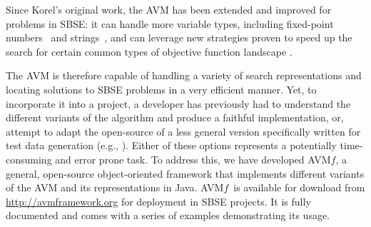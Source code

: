 \documentclass{llncs}
\newcommand{\name}{\mbox{AVM\hspace{-1pt}$f$}\xspace}
\newcommand{\repourl}{\url{http://avmframework.org}\xspace}
\begin{document}

Since Korel's original work, the AVM has been extended and improved for problems in SBSE: it can handle more variable types, including fixed-point numbers~\cite{Harman2007} and strings~\cite{Kapfhammer2013,McMinn2015}, and can leverage new strategies proven to speed up the search for certain common types of objective function landscape \cite{Kempka2013,Kempka2015}.

The AVM is therefore capable of handling a variety of search representations and locating solutions to SBSE problems in a very efficient manner. Yet, to incorporate it into a project, a developer has previously had to understand the different variants of the algorithm and produce a faithful implementation, or, attempt to adapt the open-source of a less general version specifically written for test data generation (e.g., \cite{Lakhotia2013}). Either of these options represents a potentially time-consuming and error prone task. To address this, we have developed \name, a general, open-source object-oriented framework that
implements different variants of the AVM and its representations in Java. \name~is available for download
from \repourl for deployment in SBSE projects. It is fully documented and comes with a series of examples demonstrating its usage.


\end{document}
